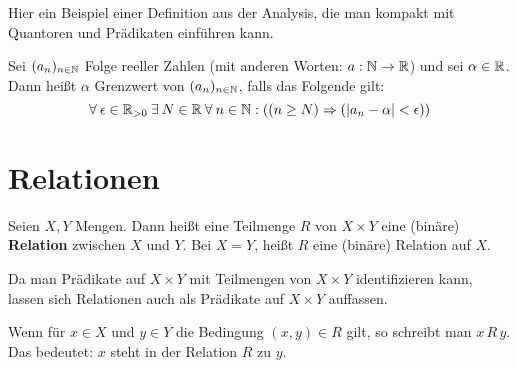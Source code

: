 \begin{bsp}
	Hier ein Beispiel einer Definition aus der Analysis, die man kompakt mit Quantoren und Prädikaten einführen kann. 
	
	Sei $ (a_n)_{n \in \mathbb{N}} $ Folge reeller Zahlen (mit anderen Worten: $ a : \mathbb{N} \to \mathbb{R} $) und sei $ \alpha \in \mathbb{R} $. Dann heißt $ \alpha $ Grenzwert von $ (a_n)_{n \in \mathbb{N}} $, falls das Folgende gilt:
	\begin{equation*}
		\forall\: \epsilon \in \mathbb{R}_{>0} \:\exists\: N \in \mathbb{R} \:\forall\: n \in \mathbb{N}: \left( (n \geq N) \Rightarrow (|a_n - \alpha| < \epsilon) \right)
	\end{equation*}
\end{bsp} 

\section{Relationen}


\begin{defn}
Seien $ X,Y $ Mengen. Dann heißt eine Teilmenge $ R $ von $ X \times Y $ eine (binäre) \textbf{Relation} zwischen $ X $ und $ Y $. Bei $X = Y$, heißt $R$ eine (binäre) Relation auf $X$. 
\end{defn}

\begin{bem}
	Da man Prädikate auf $X \times Y$ mit Teilmengen von $X \times Y$ identifizieren kann, lassen sich Relationen auch als Prädikate auf $X \times Y$ auffassen. 
\end{bem} 

\begin{bem}
Wenn für $ x \in X $ und $ y \in Y $ die Bedingung $ (x,y) \in R $ gilt, so schreibt man $ x \, R \, y $. Das bedeutet: $x$ steht in der Relation $R$ zu $y$. 
\end{bem}

